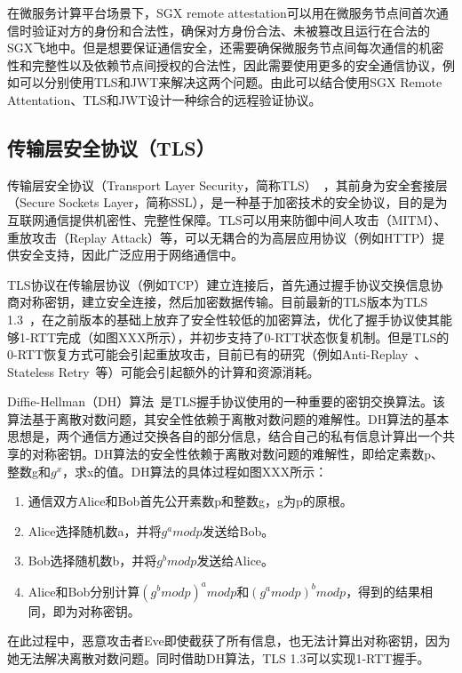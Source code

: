 在微服务计算平台场景下，SGX remote attestation可以用在微服务节点间首次通信时验证对方的身份和合法性，确保对方身份合法、未被篡改且运行在合法的SGX飞地中。但是想要保证通信安全，还需要确保微服务节点间每次通信的机密性和完整性以及依赖节点间授权的合法性，因此需要使用更多的安全通信协议，例如可以分别使用TLS和JWT来解决这两个问题。由此可以结合使用SGX Remote Attentation、TLS和JWT设计一种综合的远程验证协议。

\subsection{传输层安全协议（TLS）}

传输层安全协议（Transport Layer Security，简称TLS）~\cite{}，其前身为安全套接层（Secure Sockets Layer，简称SSL），是一种基于加密技术的安全协议，目的是为互联网通信提供机密性、完整性保障。TLS可以用来防御中间人攻击（MITM）、重放攻击（Replay Attack）等，可以无耦合的为高层应用协议（例如HTTP）提供安全支持，因此广泛应用于网络通信中。

TLS协议在传输层协议（例如TCP）建立连接后，首先通过握手协议交换信息协商对称密钥，建立安全连接，然后加密数据传输。目前最新的TLS版本为TLS 1.3~\cite{}，在之前版本的基础上放弃了安全性较低的加密算法，优化了握手协议使其能够1-RTT完成（如图XXX所示），并初步支持了0-RTT状态恢复机制。但是TLS的0-RTT恢复方式可能会引起重放攻击，目前已有的研究（例如Anti-Replay~\cite{}、Stateless Retry~\cite{}等）可能会引起额外的计算和资源消耗。

Diffie-Hellman（DH）算法~\cite{}是TLS握手协议使用的一种重要的密钥交换算法。该算法基于离散对数问题，其安全性依赖于离散对数问题的难解性。DH算法的基本思想是，两个通信方通过交换各自的部分信息，结合自己的私有信息计算出一个共享的对称密钥。DH算法的安全性依赖于离散对数问题的难解性，即给定素数p、整数g和$g^x$，求x的值。DH算法的具体过程如图XXX所示：


\begin{enumerate}
    \item 通信双方Alice和Bob首先公开素数p和整数g，g为p的原根。
    \item Alice选择随机数a，并将$g^a mod p$发送给Bob。
    \item Bob选择随机数b，并将$g^b mod p$发送给Alice。
    \item Alice和Bob分别计算$(g^b mod p)^a mod p$和$(g^a mod p)^b mod p$，得到的结果相同，即为对称密钥。
\end{enumerate}

在此过程中，恶意攻击者Eve即使截获了所有信息，也无法计算出对称密钥，因为她无法解决离散对数问题。同时借助DH算法，TLS 1.3可以实现1-RTT握手。

